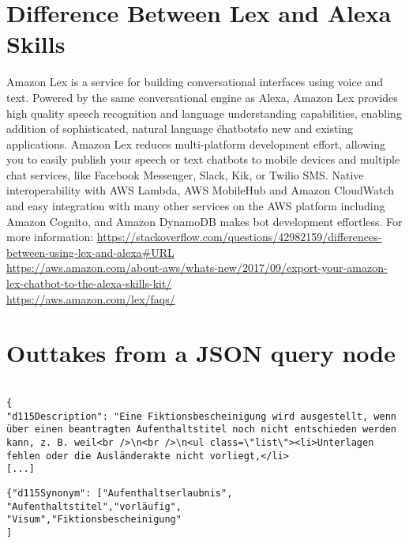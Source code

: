 \section*{Difference Between Lex and Alexa Skills}
\label{lexAlexa}  

Amazon Lex is a service for building conversational interfaces using voice and text. Powered by the same conversational engine as Alexa, Amazon Lex provides high quality speech recognition and language understanding capabilities, enabling addition of sophisticated, natural language \'chatbots\' to new and existing applications. Amazon Lex reduces multi-platform development effort, allowing you to easily publish your speech or text chatbots to mobile devices and multiple chat services, like Facebook Messenger, Slack, Kik, or Twilio SMS. Native interoperability with AWS Lambda, AWS MobileHub and Amazon CloudWatch and easy integration with many other services on the AWS platform including Amazon Cognito, and Amazon DynamoDB makes bot development effortless.
For more information: \url{https://stackoverflow.com/questions/42982159/differences-between-using-lex-and-alexa#URL}\\
\url{https://aws.amazon.com/about-aws/whats-new/2017/09/export-your-amazon-lex-chatbot-to-the-alexa-skills-kit/}\\
\url{https://aws.amazon.com/lex/faqs/}









\clearpage

\section*{Outtakes from a JSON query node}
\label{query:dl}

\begin{verbatim}

{
"d115Description": "Eine Fiktionsbescheinigung wird ausgestellt, wenn über einen beantragten Aufenthaltstitel noch nicht entschieden werden kann, z. B. weil<br />\n<br />\n<ul class=\"list\"><li>Unterlagen fehlen oder die Ausländerakte nicht vorliegt,</li>
[...]
\end{verbatim}

\begin{verbatim}
{"d115Synonym": ["Aufenthaltserlaubnis",
"Aufenthaltstitel","vorläufig", 
"Visum","Fiktionsbescheinigung"
]
\end{verbatim}

